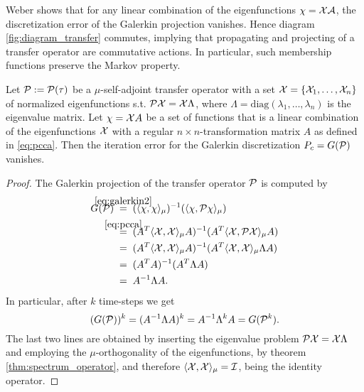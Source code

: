 Weber\cite{weber2011subspace} shows that for any linear combination of the eigenfunctions $\chi = \mathcal{X} \mathcal{A}$, the discretization error of the Galerkin projection vanishes. Hence diagram \ref{fig:diagram_transfer} commutes, implying that propagating and projecting of a transfer operator are commutative actions. In particular, such membership functions preserve the Markov property.
\begin{thm}
	\label{thm:iteration_error}
	Let $\mathcal{P} := \mathcal{P}(\tau)$ be a $\mu$-self-adjoint transfer operator with a set $\mathcal{X} = \{ \mathcal{X}_1,\dots, \mathcal{X}_n\}$ of normalized eigenfunctions s.t. $\mathcal{P} \mathcal{X} = \mathcal{X} \Lambda$, where $\Lambda = \mathrm{diag}(\lambda_1,\dots,\lambda_n)$ is the eigenvalue matrix.
	Let $\chi = \mathcal{X} A$ be a set of functions that is a linear combination of the eigenfunctions $\mathcal{X}$ with a regular $n \times n$-transformation matrix $A$ as defined in \eqref{eq:pcca}.
	Then the iteration error for the Galerkin discretization $P_c = G(\mathcal{P})$ vanishes. %
\end{thm}
\begin{proof}
	The Galerkin projection of the transfer operator $\mathcal{P}$ is computed by
	\begin{align*}
	G(\Pcal) \; & \stackrel{\mathclap{\eqref{eq:galerkin2}}}{=}  \;
	(\langle \chi, \chi \rangle_\mu)\inv (\langle \chi, \Pcal \chi \rangle_\mu) \\
	& \stackrel{\mathclap{\eqref{eq:pcca}}}{=} \;
	( A^T \langle \Xcal, \Xcal \rangle_\mu A)\inv ( A^T \langle \Xcal, \Pcal \Xcal \rangle_\mu A) \\
	& = \; ( A^T \langle \Xcal, \Xcal \rangle_\mu A)\inv ( A^T \langle \Xcal, \Xcal \rangle_\mu \Lambda A) \\
	& = \; ( A^T A)\inv ( A^T \Lambda A) \\
	& = \; A\inv \Lambda A.
	\end{align*}
	In particular, after $k$ time-steps we get
	\begin{equation*}
		(G(\mathcal{P}))^k = (A^{-1} \Lambda A)^k = A^{-1} \Lambda^k A = G(\mathcal{P}^k).
	\end{equation*}
	The last two lines are obtained by inserting the eigenvalue problem $\mathcal{P} \mathcal{X} =\mathcal{X} \Lambda$ and employing the $\mu$-orthogonality of the eigenfunctions, by theorem \ref{thm:spectrum_operator}, and therefore $ \langle \mathcal{X}, \mathcal{X} \rangle_\mu = \mathcal{I}$, being the identity operator. 
\end{proof}


